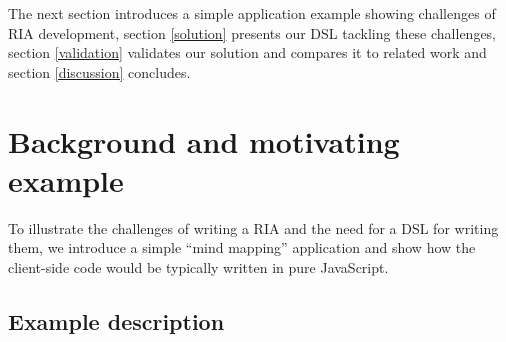 \documentclass[american,english,runningheads]{llncs}
\begin{document}
% 
% 
% 
% 
% 
% 

The next section introduces a simple application example showing challenges of RIA development, section \ref{solution} presents our DSL tackling these challenges, section \ref{validation} validates our solution and compares it to related work and section \ref{discussion} concludes.


\section{Background and motivating example}
\label{problem}

To illustrate the challenges of writing a RIA and the need for a DSL for writing them, we introduce a simple “mind mapping” application and show how the client-side code would be typically written in pure JavaScript.

\subsection{Example description}
\end{document}
